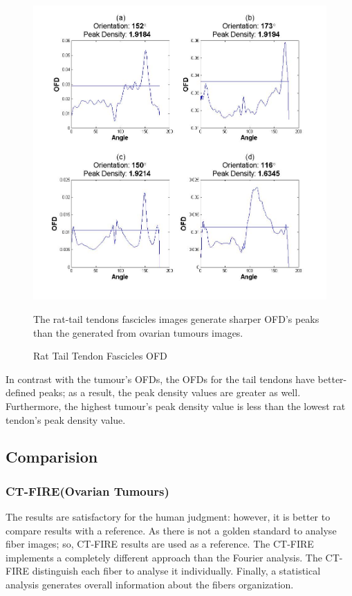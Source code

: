 \documentclass[12pt,a4paper]{article}
\begin{document}
\begin{figure}
  \includegraphics[width=\linewidth]{FiguresDisertation/figure9.png}
  \caption{Rat Tail Tendon Fascicles OFD }
  \medskip
  \small
  The rat-tail tendons fascicles images generate sharper OFD’s peaks than the generated from  ovarian tumours images.
\end{figure}

In contrast with the tumour's OFDs, the OFDs for the tail tendons have better-defined peaks; as a result, the peak density values are greater as well. Furthermore, the highest tumour's peak density value is less than the lowest rat tendon's peak density value.

\subsection{Comparision}
\subsubsection{CT-FIRE(Ovarian Tumours)}

The results are satisfactory for the human judgment: however, it is better to compare results with a reference. As there is not a golden standard to analyse fiber images; so, CT-FIRE results are used as a reference. The CT-FIRE implements a completely different approach than the Fourier analysis. The CT-FIRE distinguish each fiber to analyse it individually. Finally, a statistical analysis generates overall information about the fibers organization. 
\end{document}

